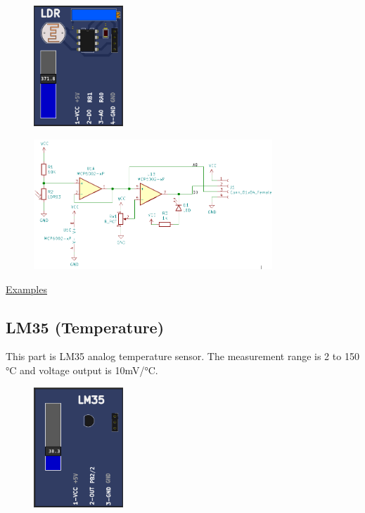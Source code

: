 \begin{figure}[H]
\center
\includegraphics[width=0.3\textwidth]{img/part_LDR.png} 
\end{figure} 

\begin{figure}[H]
\center
\includegraphics[width=0.8\textwidth]{img/part_LDR_.png} 
\end{figure} 


\href{https://lcgamboa.github.io/picsimlab_examples/parts_LDR.html}{Examples}

\vspace{0.5cm}


\subsection{LM35 (Temperature)}

This part is LM35 analog temperature sensor. The measurement range is 2 to 150 °C  and 
voltage output is 10mV/°C.

\begin{figure}[H]
\center
\includegraphics[width=0.3\textwidth]{img/part_lm35.png} 
\end{figure} 


